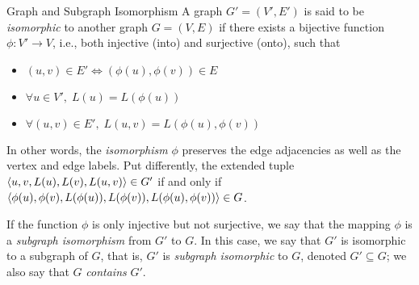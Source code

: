 \ifdefined\wox \begin{frame} \titlepage \end{frame} \fi

\begin{frame}{Graph and Subgraph Isomorphism} 
  A graph $G'=(V', E')$ is
said to be {\em isomorphic} to another graph $G=(V, E)$ if there exists
a bijective function $\phi:V' \to V$, i.e., both injective (into) and
surjective (onto), such that
\begin{itemize}
\item $(u, v) \in E' \iff (\phi(u),\phi(v)) \in E$
\item $\forall u\in V', \; L(u) = L(\phi(u))$
\item $\forall (u,v) \in E', \; L(u,v) = L(\phi(u),\phi(v))$
\end{itemize}

\bigskip
In other words, the {\em isomorphism}
$\phi$ preserves the edge
adjacencies as well as the vertex and edge labels. Put differently, the
extended tuple $\langle u, v, L(u), L(v), L(u,v) \rangle \in G'$ if and only if
$\langle \phi(u), \phi(v), L(\phi(u)), L(\phi(v)), L(\phi(u),\phi(v)) \rangle \in G$.

\bigskip
If the function $\phi$ is only injective but
not surjective, we say that the mapping $\phi$ is a {\em subgraph
isomorphism} from $G'$ to $G$.
In this case, we say that $G'$ is
isomorphic to a subgraph of $G$, that is, $G'$ is {\em subgraph
isomorphic} to $G$, denoted $G' \subseteq G$;
we also say that $G$ {\em contains} $G'$.
\end{frame}


